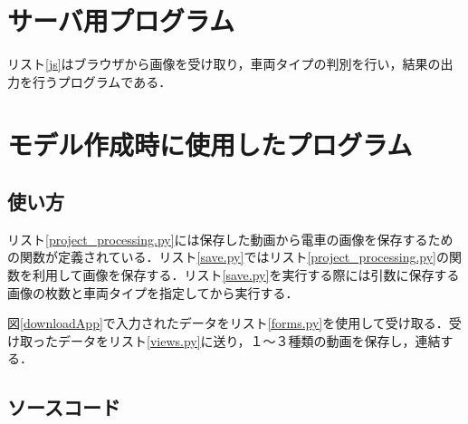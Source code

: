 

\appendix %
\chapter{サーバ用プログラム}
リスト\ref{js}はブラウザから画像を受け取り，車両タイプの判別を行い，結果の出力を行うプログラムである．

\chapter{モデル作成時に使用したプログラム}
\section{使い方}
リスト\ref{project_processing.py}には保存した動画から電車の画像を保存するための関数が定義されている．リスト\ref{save.py}ではリスト\ref{project_processing.py}の関数を利用して画像を保存する．リスト\ref{save.py}を実行する際には引数に保存する画像の枚数と車両タイプを指定してから実行する．

図\ref{downloadApp}で入力されたデータをリスト\ref{forms.py}を使用して受け取る．受け取ったデータをリスト\ref{views.py}に送り，１〜３種類の動画を保存し，連結する．

\section{ソースコード}
%







%



